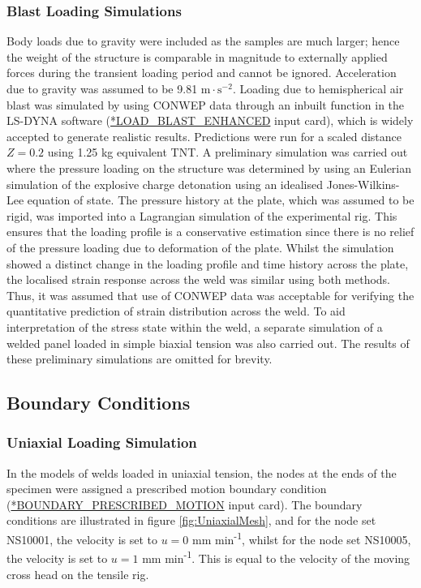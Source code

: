\subsubsection{Blast Loading Simulations}
\label{FEBlastLoading}
Body loads due to gravity were included as the samples are much larger; hence the weight of the structure is comparable in magnitude to externally applied forces during the transient loading period and cannot be ignored. Acceleration due to gravity was assumed to be 9.81 $\text{m}\!\cdot\!\text{s}^{-2}$. 
Loading due to hemispherical air blast was simulated by using CONWEP data through an inbuilt function in the LS-DYNA software (\url{*LOAD_BLAST_ENHANCED} input card), which is widely accepted to generate realistic results. Predictions were run for a scaled distance $Z=0.2$ using 1.25 kg equivalent TNT. A preliminary simulation was carried out where the pressure loading on the structure was determined by using an Eulerian simulation of the explosive charge detonation using an idealised Jones-Wilkins-Lee equation of state. The pressure history at the plate, which was assumed to be rigid, was imported into a Lagrangian simulation of the experimental rig. This ensures that the loading profile is a conservative estimation since there is no relief of the pressure loading due to deformation of the plate. Whilst the simulation showed a distinct change in the loading profile and time history across the plate, the localised strain response across the weld was similar using both methods. Thus, it was assumed that use of CONWEP data was acceptable for verifying the quantitative prediction of strain distribution across the weld. To aid interpretation of the stress state within the weld, a separate simulation of a welded panel loaded in simple biaxial tension was also carried out. The results of these preliminary simulations are omitted for brevity.
\subsection{Boundary Conditions}
\label{FEBoundaryConditions}
\subsubsection{Uniaxial Loading Simulation}
In the models of welds loaded in uniaxial tension, the nodes at the ends of the specimen were assigned a prescribed motion boundary condition (\url{*BOUNDARY_PRESCRIBED_MOTION} input card). The boundary conditions are illustrated in figure \ref{fig:UniaxialMesh}, and for the node set %
NS10001, the velocity is set to \textit{$u=0$} mm min\textsuperscript{-1}, whilst for the node set
NS10005, the velocity is set to \textit{$u=1$} mm min\textsuperscript{-1}. This is equal to the velocity of the moving cross head on the tensile rig.
